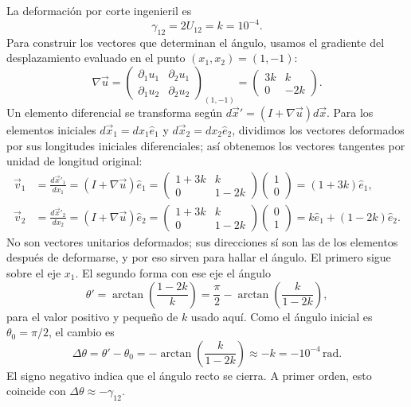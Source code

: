 \documentclass[a4paper]{article}
\begin{document}
La deformación por corte ingenieril es
$$ \gamma_{12} = 2 U_{12} = k = 10^{-4}. $$
Para construir los vectores que determinan el ángulo, usamos el gradiente del desplazamiento evaluado en el punto $(x_1,x_2)=(1,-1)$:
$$
\nabla\vec u=
\begin{pmatrix}
\partial_1u_1&\partial_2u_1\\
\partial_1u_2&\partial_2u_2
\end{pmatrix}_{(1,-1)}
=\begin{pmatrix}3k&k\\0&-2k\end{pmatrix}.
$$
Un elemento diferencial se transforma según $d\vec{x}'=(I+\nabla\vec{u})d\vec{x}$. Para los elementos iniciales $d\vec{x}_1=dx_1\hat e_1$ y $d\vec{x}_2=dx_2\hat e_2$, dividimos los vectores deformados por sus longitudes iniciales diferenciales; así obtenemos los vectores tangentes por unidad de longitud original:
$$
\begin{aligned}
\vec v_1
&=\frac{d\vec{x}'_1}{dx_1}
=(I+\nabla\vec u)\hat e_1
=\begin{pmatrix}1+3k&k\\0&1-2k\end{pmatrix}
\begin{pmatrix}1\\0\end{pmatrix}
=(1+3k)\hat e_1,\\[2mm]
\vec v_2
&=\frac{d\vec{x}'_2}{dx_2}
=(I+\nabla\vec u)\hat e_2
=\begin{pmatrix}1+3k&k\\0&1-2k\end{pmatrix}
\begin{pmatrix}0\\1\end{pmatrix}
=k\hat e_1+(1-2k)\hat e_2.
\end{aligned}
$$
No son vectores unitarios deformados; sus direcciones sí son las de los elementos después de deformarse, y por eso sirven para hallar el ángulo.
El primero sigue sobre el eje $x_1$. El segundo forma con ese eje el ángulo
$$
\theta'=\arctan\!\left(\frac{1-2k}{k}\right)
=\frac{\pi}{2}-\arctan\!\left(\frac{k}{1-2k}\right),
$$
para el valor positivo y pequeño de $k$ usado aquí. Como el ángulo inicial es $\theta_0=\pi/2$, el cambio es
$$
\Delta\theta=\theta'-\theta_0
=-\arctan\!\left(\frac{k}{1-2k}\right)
\approx -k=-10^{-4}\,\text{rad}.
$$
El signo negativo indica que el ángulo recto se cierra. A primer orden, esto coincide con $\Delta\theta\approx-\gamma_{12}$.
\end{document}
